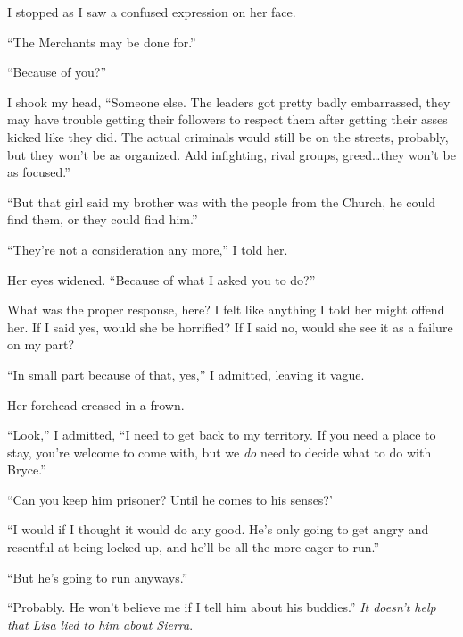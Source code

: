 I stopped as I saw a confused expression on her face.



``The Merchants may be done for.''



``Because of you?''



I shook my head, ``Someone else.  The leaders got pretty badly embarrassed, they may have trouble getting their followers to respect them after getting their asses kicked like they did.  The actual criminals would still be on the streets, probably, but they won't be as organized.  Add infighting, rival groups, greed\ldots they won't be as focused.''



``But that girl said my brother was with the people from the Church, he could find them, or they could find him.''



``They're not a consideration any more,'' I told her.



Her eyes widened.  ``Because of what I asked you to do?''



What was the proper response, here?  I felt like anything I told her might offend her.  If I said yes, would she be horrified?  If I said no, would she see it as a failure on my part?



``In small part because of that, yes,'' I admitted, leaving it vague.



Her forehead creased in a frown.



``Look,'' I admitted, ``I need to get back to my territory.  If you need a place to stay, you're welcome to come with, but we \emph{do} need to decide what to do with Bryce.''



``Can you keep him prisoner?  Until he comes to his senses?'



``I would if I thought it would do any good.  He's only going to get angry and resentful at being locked up, and he'll be all the more eager to run.''



``But he's going to run anyways.''



``Probably.  He won't believe me if I tell him about his buddies.''  \emph{It doesn't help that Lisa lied to him about Sierra}.



